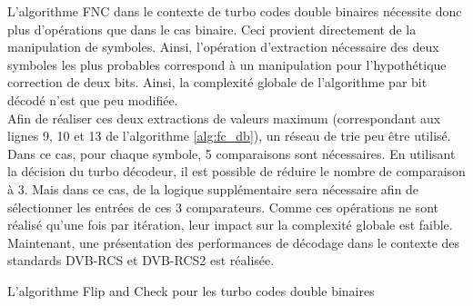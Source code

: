 L'algorithme FNC dans le contexte de turbo codes double binaires nécessite donc plus d'opérations que dans le cas binaire.
Ceci provient directement de la manipulation de symboles. Ainsi, l'opération d'extraction nécessaire des deux symboles 
les plus probables correspond à un manipulation pour l'hypothétique correction de deux bits. Ainsi, la complexité globale
de l'algorithme par bit décodé n'est que peu modifiée.\\
Afin de réaliser ces deux extractions de valeurs maximum (correspondant aux lignes 9, 10 et 13 de l'algorithme 
\ref{alg:fc_db}), un réseau de trie peu être utilisé. Dans ce cas, pour chaque symbole, 5 comparaisons sont nécessaires.
En utilisant la décision du turbo décodeur, il est possible de réduire le nombre de comparaison à 3. Mais dans ce cas,
de la logique supplémentaire sera nécessaire afin de sélectionner les entrées de ces 3 comparateurs. Comme ces opérations
ne sont réalisé qu'une fois par itération, leur impact sur la complexité globale est faible. Maintenant, une présentation
des performances de décodage dans le contexte des standards DVB-RCS et DVB-RCS2 est réalisée.
\begin{center}
\begin{minipage}{.95\textwidth}%
\begin{algorithm}[H]
\label{alg:fc_db}
	\DontPrintSemicolon
	
	\;
	\caption{L'algorithme Flip and Check pour les turbo codes double binaires}
\end{algorithm}
\end{minipage}
\end{center}


